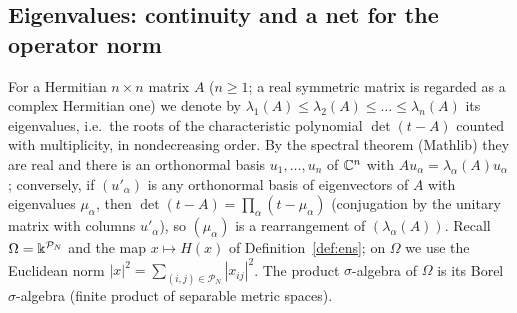 \subsection{Eigenvalues: continuity and a net for the operator norm}\label{sec:eig}
For a Hermitian $n\times n$ matrix $A$ ($n\ge1$; a real symmetric matrix is regarded as a complex Hermitian one) we denote by
$\lambda_1(A)\le\lambda_2(A)\le\dots\le\lambda_n(A)$ its eigenvalues, i.e.\ the roots of the characteristic polynomial $\det(t-A)$ counted with multiplicity, in nondecreasing order.
By the spectral theorem (Mathlib) they are real and there is an orthonormal basis $u_1,\dots,u_n$ of $\mathbb{C}^n$ with $Au_\alpha=\lambda_\alpha(A)u_\alpha$; conversely, if $(u'_\alpha)$ is any orthonormal basis of eigenvectors of $A$ with eigenvalues $\mu_\alpha$, then
$\det(t-A)=\prod_\alpha(t-\mu_\alpha)$ (conjugation by the unitary matrix with columns $u'_\alpha$), so $(\mu_\alpha)$ is a rearrangement of $(\lambda_\alpha(A))$.
Recall $\Omega=\Bbbk^{\mathcal P_N}$ and the map $x\mapsto H(x)$ of Definition~\ref{def:ens}; on $\Omega$ we use the Euclidean norm $|x|^2=\sum_{(i,j)\in\mathcal P_N}|x_{ij}|^2$. The product $\sigma$-algebra of $\Omega$ is its Borel $\sigma$-algebra (finite product of separable metric spaces).


